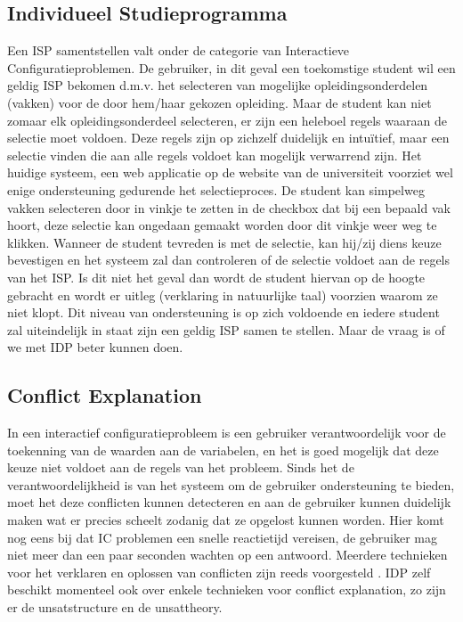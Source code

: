 \subsection{Individueel Studieprogramma}
Een ISP samentstellen valt onder de categorie van Interactieve Configuratieproblemen. De gebruiker, in dit geval een toekomstige student wil een geldig ISP bekomen d.m.v. het selecteren van mogelijke opleidingsonderdelen (vakken) voor de door hem/haar gekozen opleiding. Maar de student kan niet zomaar elk opleidingsonderdeel selecteren, er zijn een heleboel regels waaraan de selectie moet voldoen. Deze regels zijn op zichzelf duidelijk en intu\"{i}tief, maar een selectie vinden die aan alle regels voldoet kan mogelijk verwarrend zijn. Het huidige systeem, een web applicatie op de website van de universiteit voorziet wel enige ondersteuning gedurende het selectieproces. De student kan simpelweg vakken selecteren door in vinkje te zetten in de checkbox dat bij een bepaald vak hoort, deze selectie kan ongedaan gemaakt worden door dit vinkje weer weg te klikken. Wanneer de student tevreden is met de selectie, kan hij/zij diens keuze bevestigen en het systeem zal dan controleren of de selectie voldoet aan de regels van het ISP. Is dit niet het geval dan wordt de student hiervan op de hoogte gebracht en wordt er uitleg (verklaring in natuurlijke taal) voorzien waarom ze niet klopt. Dit niveau van ondersteuning is op zich voldoende en iedere student zal uiteindelijk in staat zijn een geldig ISP samen te stellen. Maar de vraag is of we met IDP beter kunnen doen. 

\subsection{Conflict Explanation}
In een interactief configuratieprobleem is een gebruiker verantwoordelijk voor de toekenning van de waarden aan de variabelen, en het is goed mogelijk dat deze keuze niet voldoet aan de regels van het probleem. Sinds het de verantwoordelijkheid is van het systeem om de gebruiker ondersteuning te bieden, moet het deze conflicten kunnen detecteren en aan de gebruiker kunnen duidelijk maken wat er precies scheelt zodanig dat ze opgelost kunnen worden. Hier komt nog eens bij dat IC problemen een snelle reactietijd vereisen, de gebruiker mag niet meer dan een paar seconden wachten op een antwoord. Meerdere technieken voor het verklaren en oplossen van conflicten zijn reeds voorgesteld \cite{o2005generating} \cite{o2007representative} \citep{felfernig2001intelligent}. IDP zelf beschikt momenteel ook over enkele technieken voor conflict explanation, zo zijn er de unsatstructure en de unsattheory.

